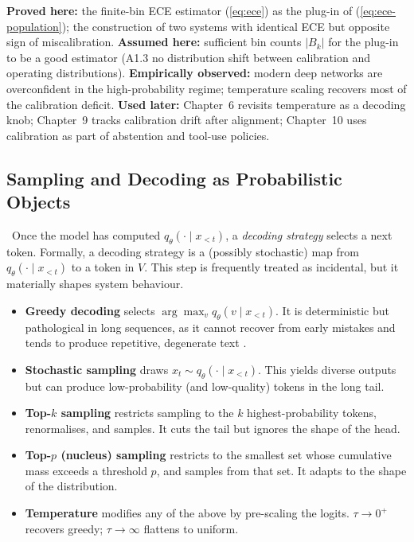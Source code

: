 \begin{provedassumed}
\textbf{Proved here:} the finite-bin ECE estimator (\ref{eq:ece}) as
the plug-in of (\ref{eq:ece-population}); the construction of two
systems with identical ECE but opposite sign of miscalibration.
\textbf{Assumed here:} sufficient bin counts $|B_k|$ for the plug-in
to be a good estimator (A1.3 no distribution shift between
calibration and operating distributions).
\textbf{Empirically observed:} modern deep networks are overconfident
in the high-probability regime; temperature scaling recovers most of
the calibration deficit.
\textbf{Used later:} Chapter~6 revisits temperature as a decoding knob;
Chapter~9 tracks calibration drift after alignment; Chapter~10 uses
calibration as part of abstention and tool-use policies.
\end{provedassumed}

\subsection{Sampling and Decoding as Probabilistic Objects}

\Def\ Once the model has computed $q_\theta(\cdot \mid x_{<t})$, a
\emph{decoding strategy} selects a next token. Formally, a decoding
strategy is a (possibly stochastic) map from $q_\theta(\cdot \mid
x_{<t})$ to a token in $V$. This step is frequently treated as
incidental, but it materially shapes system behaviour.

\begin{itemize}
  \item \textbf{Greedy decoding} selects $\arg\max_v q_\theta(v \mid
  x_{<t})$. It is deterministic but pathological in long sequences, as
  it cannot recover from early mistakes and tends to produce repetitive,
  degenerate text \citep{holtzman2020curious}.
  \item \textbf{Stochastic sampling} draws $x_t \sim q_\theta(\cdot
  \mid x_{<t})$. This yields diverse outputs but can produce
  low-probability (and low-quality) tokens in the long tail.
  \item \textbf{Top-$k$ sampling} restricts sampling to the $k$
  highest-probability tokens, renormalises, and samples. It cuts the
  tail but ignores the shape of the head.
  \item \textbf{Top-$p$ (nucleus) sampling} restricts to the smallest
  set whose cumulative mass exceeds a threshold $p$, and samples from
  that set. It adapts to the shape of the distribution.
  \item \textbf{Temperature} modifies any of the above by pre-scaling
  the logits. $\tau \to 0^+$ recovers greedy; $\tau \to \infty$ flattens
  to uniform.
\end{itemize}

